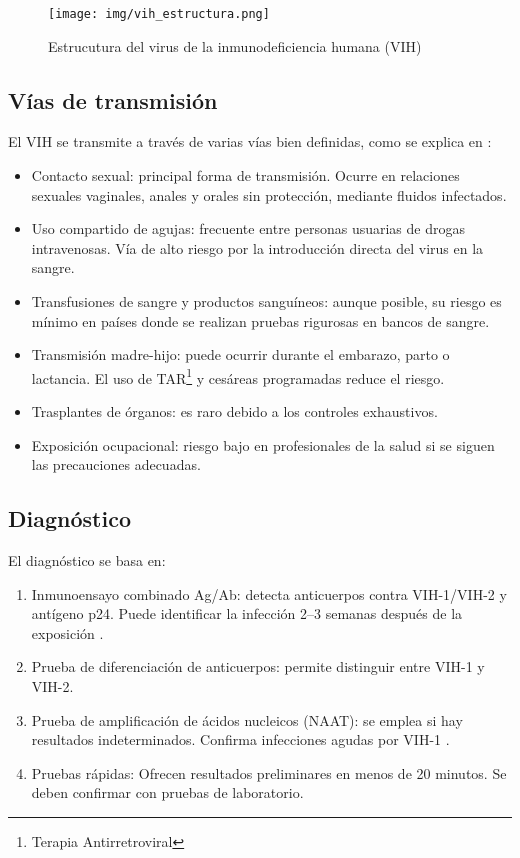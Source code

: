 \begin{figure}[H]
    \centering
    \texttt{[image: img/vih\_estructura.png]}
    \caption{Estrucutura del virus de la inmunodeficiencia humana (VIH)}
    \label{fig:vih estructura}
    \vspace{0.5cm} %
\end{figure}

\subsection{Vías de transmisión}
El VIH se transmite a través de varias vías bien definidas, como se explica en \cite{shaw2012hiv}:
\begin{itemize}
    \item Contacto sexual: principal forma de transmisión. Ocurre en relaciones sexuales vaginales, anales y orales sin protección, mediante fluidos infectados.
    \item Uso compartido de agujas: frecuente entre personas usuarias de drogas intravenosas. Vía de alto riesgo por la introducción directa del virus en la sangre.
    \item Transfusiones de sangre y productos sanguíneos: aunque posible, su riesgo es mínimo en países donde se realizan pruebas rigurosas en bancos de sangre.
    \item Transmisión madre-hijo: puede ocurrir durante el embarazo, parto o lactancia. El uso de TAR\footnote{Terapia Antirretroviral} y cesáreas programadas reduce el riesgo.
    \item Trasplantes de órganos: es raro debido a los controles exhaustivos.
    \item Exposición ocupacional: riesgo bajo en profesionales de la salud si se siguen las precauciones adecuadas.
\end{itemize}

\subsection{Diagnóstico}
El diagnóstico se basa en:
\begin{enumerate}
    \item Inmunoensayo combinado Ag/Ab: detecta anticuerpos contra VIH-1/VIH-2 y antígeno p24. Puede identificar la infección 2–3 semanas después de la exposición \cite{workowski2021sexually}.
    \item Prueba de diferenciación de anticuerpos: permite distinguir entre VIH-1 y VIH-2.
    \item Prueba de amplificación de ácidos nucleicos (NAAT): se emplea si hay resultados indeterminados. Confirma infecciones agudas por VIH-1 \cite{saag2021hiv}.
    \item Pruebas rápidas: Ofrecen resultados preliminares en menos de 20 minutos. Se deben confirmar con pruebas de laboratorio.
\end{enumerate}

